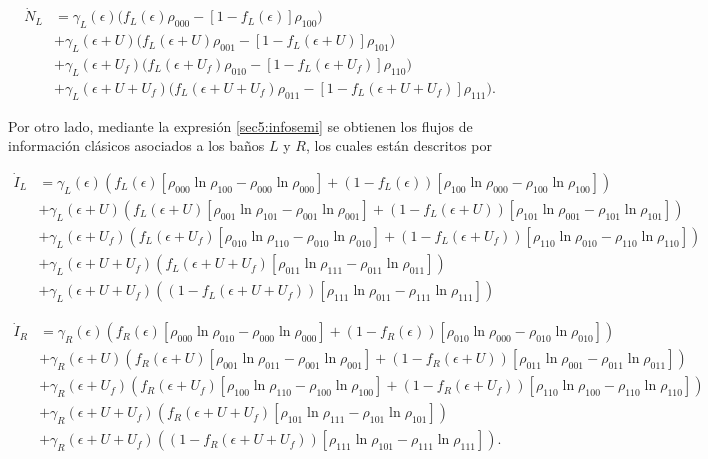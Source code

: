 \begin{align*}
    \dot{N}_{L} & = \gamma_{L}(\epsilon)\big(f_{L}(\epsilon)\rho_{000} - [1-f_{L}(\epsilon)]\rho_{100} \big) \\
        & + \gamma_{L}(\epsilon + U) \big(f_{L}(\epsilon+U)\rho_{001} - [1-f_{L}(\epsilon+U)]\rho_{101} \big)  \\
        & + \gamma_{L}(\epsilon + U_{f}) \big(f_{L}(\epsilon+U_{f})\rho_{010} - [1-f_{L}(\epsilon+U_{f})]\rho_{110} \big)  \\  
        & + \gamma_{L}(\epsilon + U + U_{f}) \big(f_{L}(\epsilon+U + U_{f})\rho_{011} - [1-f_{L}(\epsilon+U+U_{f})]\rho_{111} \big).
\end{align*}

Por otro lado, mediante la expresión \ref{sec5:infosemi} se obtienen los flujos de información clásicos asociados a los baños $L$ y $R$, los cuales están descritos por

\begin{align*}
  \dot{I}_{L}  &  =  \gamma_{L}(\epsilon)(f_{L}(\epsilon)[\rho_{000}\ln \rho_{100} - \rho_{000}\ln \rho_{000}] + (1-f_{L}(\epsilon))[\rho_{100}\ln \rho_{000} - \rho_{100}\ln \rho_{100} ] )  \\ 
      & + \gamma_{L}(\epsilon + U)(f_{L}(\epsilon + U)[\rho_{001}\ln \rho_{101} - \rho_{001}\ln \rho_{001}] + (1-f_{L}(\epsilon + U))[\rho_{101}\ln \rho_{001} -\rho_{101}\ln \rho_{101} ]   ) \\  
      & + \gamma_{L}(\epsilon + U_{f})( f_{L}(\epsilon + U_{f})[\rho_{010}\ln \rho_{110} -\rho_{010}\ln \rho_{010} ]  + (1-f_{L}(\epsilon + U_{f}))[\rho_{110}\ln \rho_{010} - \rho_{110}\ln \rho_{110} ] ) \\  
      & + \gamma_{L}(\epsilon + U + U_{f})( f_{L}(\epsilon + U + U_{f})[\rho_{011}\ln \rho_{111}- \rho_{011}\ln \rho_{011}]) \\   
      & + \gamma_{L}(\epsilon + U + U_{f})( (1-f_{L}(\epsilon+U+U_{f}) )[\rho_{111}\ln \rho_{011} - \rho_{111}\ln \rho_{111}])   
\end{align*}

\begin{align*}
 \dot{I}_{R} & =  \gamma_{R}(\epsilon)(f_{R}(\epsilon)[\rho_{000}\ln \rho_{010} - \rho_{000}\ln \rho_{000}] + (1-f_{R}(\epsilon))[\rho_{010}\ln \rho_{000} - \rho_{010}\ln \rho_{010} ] )  \\ 
      & + \gamma_{R}(\epsilon + U)(f_{R}(\epsilon + U)[\rho_{001}\ln \rho_{011} - \rho_{001}\ln \rho_{001}] + (1-f_{R}(\epsilon + U))[\rho_{011}\ln \rho_{001} -\rho_{011}\ln \rho_{011} ]   ) \\  
      & + \gamma_{R}(\epsilon + U_{f})( f_{R}(\epsilon + U_{f})[\rho_{100}\ln \rho_{110} - \rho_{100}\ln \rho_{100} ]  + (1-f_{R}(\epsilon + U_{f}))[\rho_{110}\ln \rho_{100} - \rho_{110}\ln \rho_{110} ] ) \\  
      & + \gamma_{R}(\epsilon + U + U_{f})( f_{R}(\epsilon + U + U_{f})[\rho_{101}\ln \rho_{111}- \rho_{101}\ln \rho_{101}]) \\   
      & + \gamma_{R}(\epsilon + U + U_{f})( (1-f_{R}(\epsilon+U+U_{f}) )[\rho_{111}\ln \rho_{101} - \rho_{111}\ln \rho_{111}]).   
\end{align*}

